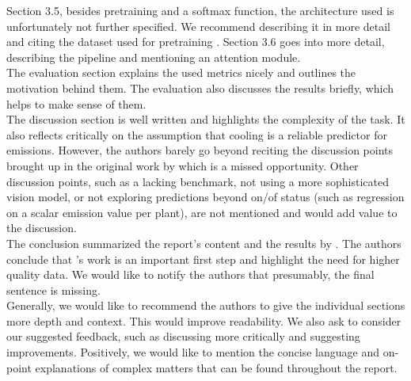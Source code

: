 \documentclass{article} %
\begin{document}
Section 3.5, besides pretraining and a softmax function, the architecture used is unfortunately not further specified. We recommend describing it in more detail and citing the dataset used for pretraining \cite{cheng2017remote}. Section 3.6 goes into more detail, describing the pipeline and mentioning an attention module.\\
The evaluation section explains the used metrics nicely and outlines the motivation behind them. The evaluation also discusses the results briefly, which helps to make sense of them.\\
The discussion section is well written and highlights the complexity of the task. It also reflects critically on the assumption that cooling is a reliable predictor for emissions. However, the authors barely go beyond reciting the discussion points brought up in the original work by \citet{couture2020towards} which is a missed opportunity. Other discussion points, such as a lacking benchmark, not using a more sophisticated vision model, or not exploring predictions beyond on/of status (such as regression on a scalar emission value per plant), are not mentioned and would add value to the discussion.\\
The conclusion summarized the report's content and the results by \citet{couture2020towards}. The authors conclude that \citet{couture2020towards}'s work is an important first step and highlight the need for higher quality data. We would like to notify the authors that presumably, the final sentence is missing.\\
Generally, we would like to recommend the authors to give the individual sections more depth and context. This would improve readability. We also ask to consider our suggested feedback, such as discussing \citet{couture2020towards} more critically and suggesting improvements. Positively, we would like to mention the concise language and on-point explanations of complex matters that can be found throughout the report.






\end{document}
